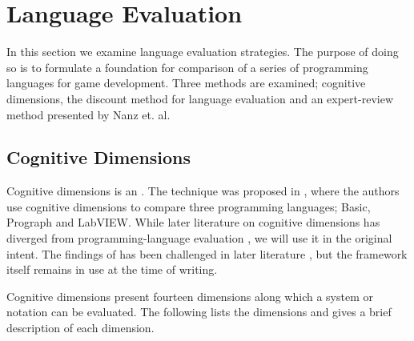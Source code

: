 \section{Language Evaluation} \label{sec:language-evaluation}
In this section we examine language evaluation strategies. The purpose of doing so is to formulate a foundation for comparison of a series of programming languages for game development. 
Three methods are examined; cognitive dimensions\cite{green1996usability}, the discount method for language evaluation\cite{kurtev2016discount} and an expert-review method presented by Nanz et. al\cite{nanz2013benchmarking,nanz2013examining}.

\subsection{Cognitive Dimensions} \label{sec:cog-dim}
Cognitive dimensions is an \textit{} \cite{green1996usability}. The technique was proposed in \cite{green1996usability}, where the authors use cognitive dimensions to compare three programming languages; Basic, Prograph and LabVIEW. While later literature on cognitive dimensions has diverged from programming-language evaluation \cite{blackwell2001cognitive}, we will use it in the original intent. The findings of \cite{green1996usability} has been challenged in later literature \cite{petre1995looking}, but the framework itself remains in use at the time of writing.

Cognitive dimensions present fourteen dimensions along which a system or notation can be evaluated. The following lists the dimensions and gives a brief description of each dimension. 

